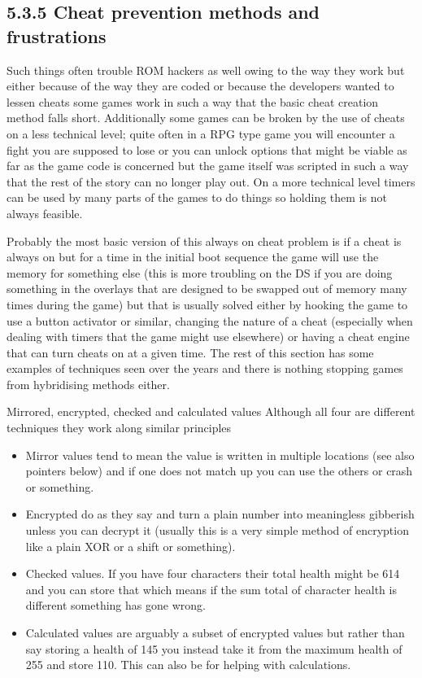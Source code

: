 \documentclass[
]{book}
\providecommand{\tightlist}{%
  \setlength{\itemsep}{0pt}\setlength{\parskip}{0pt}}
\begin{document}
\hypertarget{cheat-prevention-methods-and-frustrations}{%
\subsection{5.3.5 Cheat prevention methods and frustrations}\label{cheat-prevention-methods-and-frustrations}}

Such things often trouble ROM hackers as well owing to the way they work but either because of the way they are coded or because the developers wanted to lessen cheats some games work in such a way that the basic cheat creation method falls short. Additionally some games can be broken by the use of cheats on a less technical level; quite often in a RPG type game you will encounter a fight you are supposed to lose or you can unlock options that might be viable as far as the game code is concerned but the game itself was scripted in such a way that the rest of the story can no longer play out. On a more technical level timers can be used by many parts of the games to do things so holding them is not always feasible.

Probably the most basic version of this always on cheat problem is if a cheat is always on but for a time in the initial boot sequence the game will use the memory for something else (this is more troubling on the DS if you are doing something in the overlays that are designed to be swapped out of memory many times during the game) but that is usually solved either by hooking the game to use a button activator or similar, changing the nature of a cheat (especially when dealing with timers that the game might use elsewhere) or having a cheat engine that can turn cheats on at a given time. The rest of this section has some examples of techniques seen over the years and there is nothing stopping games from hybridising methods either.

Mirrored, encrypted, checked and calculated values Although all four are different techniques they work along similar principles

\begin{itemize}
\tightlist
\item
  Mirror values tend to mean the value is written in multiple locations (see also pointers below) and if one does not match up you can use the others or crash or something.
\item
  Encrypted do as they say and turn a plain number into meaningless gibberish unless you can decrypt it (usually this is a very simple method of encryption like a plain XOR or a shift or something).
\item
  Checked values. If you have four characters their total health might be 614 and you can store that which means if the sum total of character health is different something has gone wrong.
\item
  Calculated values are arguably a subset of encrypted values but rather than say storing a health of 145 you instead take it from the maximum health of 255 and store 110. This can also be for helping with calculations.
\end{itemize}
\end{document}
